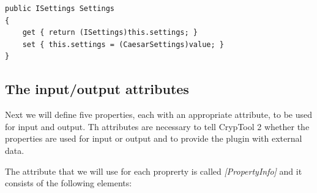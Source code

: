 \begin{lstlisting}
public ISettings Settings
{
	get { return (ISettings)this.settings; }
	set { this.settings = (CaesarSettings)value; }
}
\end{lstlisting}
\clearpage

\subsection{The input/output attributes}
\label{sec:TheInputOutputAttributes}

\indent Next we will define five properties, each with an appropriate attribute, to be used for input and output. Th attributes are necessary to tell CrypTool 2 whether the properties are used for input or output and to provide the plugin with external data.

The attribute that we will use for each proprerty is called \textit{[PropertyInfo]} and it consists of the following elements:

